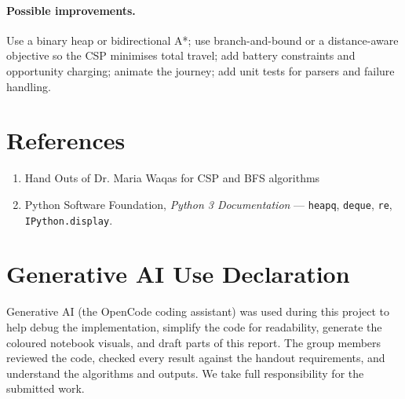 \documentclass[11pt,a4paper]{article}
\newcommand{\code}[1]{\texttt{#1}}
\begin{document}
\paragraph{Possible improvements.} Use a binary heap or bidirectional A*; use branch-and-bound
or a distance-aware objective so the CSP minimises total travel; add battery constraints and
opportunity charging; animate the journey; add unit tests for parsers and failure handling.

\section{References}

\begin{enumerate}[leftmargin=1.2cm]
  \item Hand Outs of Dr. Maria Waqas for CSP and BFS algorithms
  \item Python Software Foundation, \emph{Python 3 Documentation} --- \code{heapq},
        \code{deque}, \code{re}, \code{IPython.display}.
\end{enumerate}

\section{Generative AI Use Declaration}

Generative AI (the OpenCode coding assistant) was used during this project to help debug the
implementation, simplify the code for readability, generate the coloured notebook visuals, and
draft parts of this report. The group members reviewed the code, checked every result against
the handout requirements, and understand the algorithms and outputs. We take full
responsibility for the submitted work.
\end{document}
